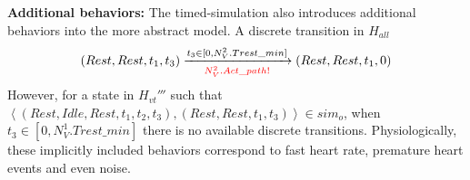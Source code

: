 \textbf{Additional behaviors: }The timed-simulation also introduces additional behaviors into the more abstract model. A discrete transition in $H_{all}$
$$(Rest,Rest,t_1,t_3)\xrightarrow[\textcolor{red}{N^2_V.Act\_path!}]{t_3\in [0, N^2_V.Trest\_min]}(Rest,Rest,t_1,0)$$
However, for a state in $H_{vt}'''$ such that $\left\langle (Rest,Idle,Rest,t_1,t_2,t_3),(Rest,Rest,t_1,t_3)\right\rangle\in sim_o$, when $t_3\in [0, N^1_V.Trest\_min]$ there is no available discrete transitions. Physiologically, these implicitly included behaviors correspond to fast heart rate, premature heart events and even noise.


%





